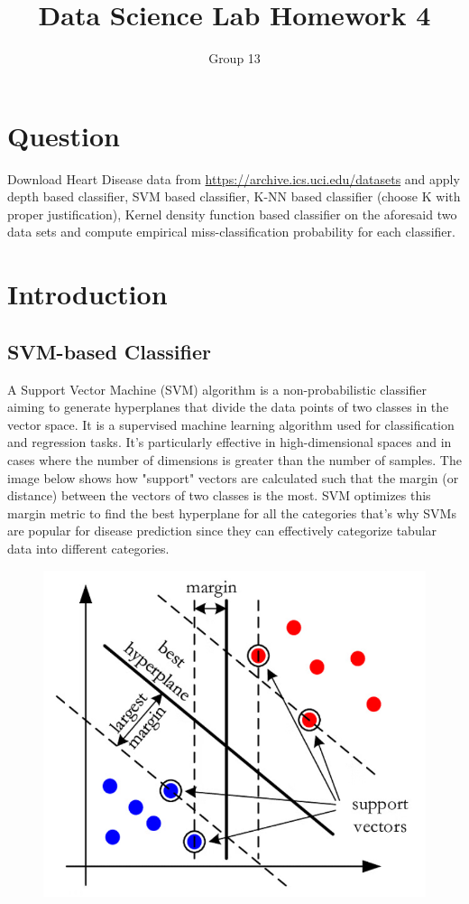\documentclass{article}
\title{Data Science Lab Homework 4}
\author{Group 13}
\date{}
\begin{document}
\maketitle

\section{Question}
Download Heart Disease data from \href{https://archive.ics.uci.edu/datasets}{https://archive.ics.uci.edu/datasets} and apply depth based classifier, SVM based classifier, K-NN based classifier (choose K with proper justification), Kernel density function based classifier on the aforesaid two data sets and compute empirical miss-classification probability for each classifier.

\section{Introduction}

\subsection{SVM-based Classifier}
A Support Vector Machine (SVM) algorithm is a non-probabilistic classifier aiming to generate hyperplanes that divide the data points of two classes in the vector space. 
It is a supervised machine learning algorithm used for classification and regression tasks. It’s particularly effective in high-dimensional spaces and in cases where the number of dimensions is greater than the number of samples.
The image below shows how "support" vectors are calculated such that the margin (or distance) between the vectors of two classes is the most. SVM optimizes this margin metric to find the best hyperplane for all the categories that's why SVMs are popular for disease prediction since they can effectively categorize tabular data into different categories.

\begin{figure}[h]
\centering
    \includegraphics[width=0.55\linewidth]{SVM_Heart_Disease.png}
\end{figure}
\end{document}
